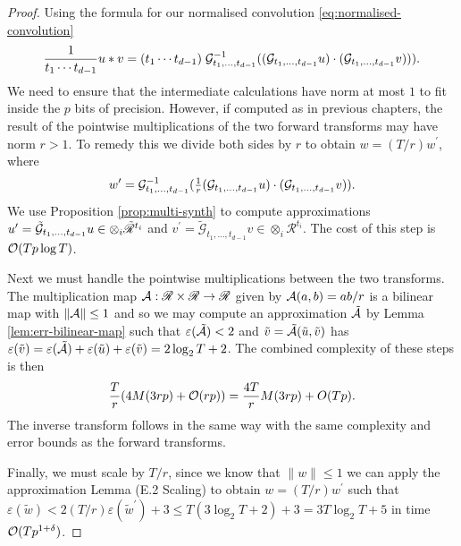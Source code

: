 \begin{proof}
    Using the formula for our normalised convolution \eqref{eq:normalised-convolution}
    \[
        \frac{1}{t_1 \cdots t_{d-1}}u \ast v = (t_1 \cdots t_{d-1})\; \mathcal G^{-1}_{t_1, \ldots, t_{d-1}}((\mathcal G_{t_1, \ldots, t_{d-1}}u)\cdot (\mathcal G_{t_1, \ldots, t_{d-1}} v))).
    \]
    We need to ensure that the intermediate calculations have norm at most $1$ to fit inside the $p$ bits of precision. However, if computed as in previous chapters, the result of the pointwise multiplications of the two forward transforms may have norm $r > 1$. To remedy this we divide both sides by $r$ to obtain $w = (T/r)w^\prime$, where
    \begin{equation}\label{eq:idk}
        w^\prime = \mathcal G^{-1}_{t_1, \ldots, t_{d-1}}(\tfrac{1}{r}(\mathcal G_{t_1, \ldots, t_{d-1}}u) \cdot (\mathcal G_{t_1, \ldots, t_{d-1}}v)).
    \end{equation}
    We use Proposition \ref{prop:multi-synth} to compute approximations $u^\prime = \tilde{\mathcal G}_{t_1, \ldots, t_{d-1}} u \in \otimes_i \tilde{\mathscr{R}}^{t_i}$ and $v^\prime = \tilde{\mathscr{G}}_{t_1, \ldots, t_{d-1}} v \in \otimes_i \mathscr{R}^{t_i}$. The cost of this step is $\mathcal O(Tp \log T)$.

    Next we must handle the pointwise multiplications between the two transforms. The multiplication map $\mathcal A: \mathscr{R} \times \mathscr{R} \to \mathscr{R}$ given by $\mathcal A(a, b) = ab/r$ is a bilinear map with $\|\mathcal A\| \le 1$ and so we may compute an approximation $\tilde{\mathcal A}$ by Lemma \ref{lem:err-bilinear-map} such that $\varepsilon(\tilde{\mathcal A}) < 2$ and $\tilde{v} = \tilde{\mathcal A}(\tilde{u}, \tilde{v})$ has $\varepsilon(\tilde{v}) = \varepsilon(\tilde{\mathcal A}) + \varepsilon(\tilde{u}) + \varepsilon(\tilde{v}) = 2\log_2 T + 2$. The combined complexity of these steps is then
    \[
        \frac{T}{r}(4M(3rp) + \mathcal O(rp)) = \frac{4T}{r} M(3rp) + O(Tp).
    \]
    The inverse transform follows in the same way with the same complexity and error bounds as the forward transforms.

    Finally, we must scale by $T/r$, since we know that $\|w\| \le 1$ we can apply the approximation Lemma (E.2 Scaling) to obtain $w = (T/r)w^\prime$ such that $\varepsilon(\tilde{w}) < 2(T/r)\varepsilon(\tilde{w}^\prime) + 3 \le T(3 \log_2 T + 2) + 3 = 3T\log_2 T + 5$ in time $\mathcal O(Tp^{1 + \delta})$.
\end{proof}

